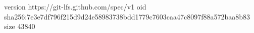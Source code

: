 version https://git-lfs.github.com/spec/v1
oid sha256:7e3e7df796f215d9d24e58983738bdd1779c7603caa47c8097f88a572baa8b83
size 43840
